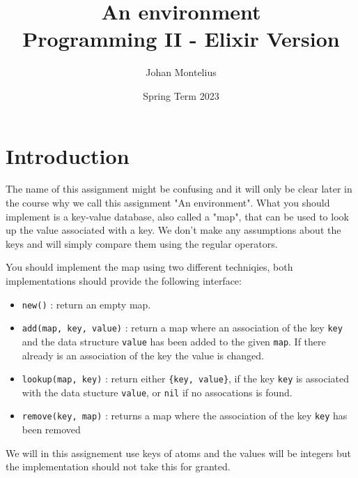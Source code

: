 \documentclass[a4paper,11pt]{article}
\begin{document}

\title{
    \textbf{An environment}\\
    \large{Programming II - Elixir Version}
}
\author{Johan Montelius}
\date{Spring Term 2023}
\maketitle
{}



\section*{Introduction}

The name of this assignment might be confusing and it will only be
clear later in the course why we call this assignment "An
environment". What you should implement is a key-value database, also called a "map", that
can be used to look up the value associated with a key. We don't make
any assumptions about the keys and will simply compare them using the
regular operators. 

You should implement the map using two different techniqies, both
implementations should provide the following interface:

\begin{itemize}
\item {\tt new()} : return an empty map.

\item {\tt add(map, key, value)} : return a map where an association of
  the key {\tt key} and the data structure {\tt value} has been added to
  the given {\tt map}. If there already is an association of the key
  the value is changed.

\item {\tt lookup(map, key)} : return either {\tt \{key, value\}}, if
  the key {\tt key} is associated with the data stucture {\tt value},
  or {\tt nil} if no assocations is found.

\item {\tt remove(key, map)} : returns a map where the
  association of the key {\tt key} has been removed
\end{itemize}


We will in this assignement use keys of atoms and the values will be
integers but the implementation should not take this for granted.
\end{document}
